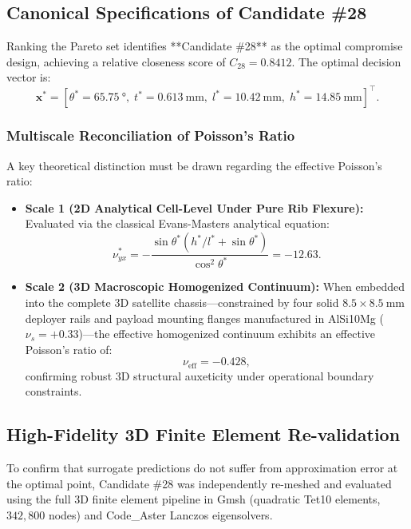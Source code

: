 \subsection{Canonical Specifications of Candidate \#28}

Ranking the Pareto set identifies **Candidate \#28** as the optimal compromise design, achieving a relative closeness score of $C_{28} = 0.8412$. The optimal decision vector is:
\begin{equation}
\mathbf{x}^* = \left[ \theta^* = \SI{65.75}{\degree}, \; t^* = \SI{0.613}{\milli\meter}, \; l^* = \SI{10.42}{\milli\meter}, \; h^* = \SI{14.85}{\milli\meter} \right]^\top.
\label{eq:candidate28_vars}
\end{equation}

\subsubsection{Multiscale Reconciliation of Poisson's Ratio}
A key theoretical distinction must be drawn regarding the effective Poisson's ratio:
\begin{itemize}
\item \textbf{Scale 1 (2D Analytical Cell-Level Under Pure Rib Flexure):} Evaluated via the classical Evans-Masters analytical equation:
\begin{equation}
\nu_{yx}^* = -\frac{\sin\theta^* (h^*/l^* + \sin\theta^*)}{\cos^2\theta^*} = -12.63.
\label{eq:poisson_2d}
\end{equation}
\item \textbf{Scale 2 (3D Macroscopic Homogenized Continuum):} When embedded into the complete 3D satellite chassis—constrained by four solid $8.5 \times \SI{8.5}{\milli\meter}$ deployer rails and payload mounting flanges manufactured in AlSi10Mg ($\nu_s = +0.33$)—the effective homogenized continuum exhibits an effective Poisson's ratio of:
\begin{equation}
\nu_{\text{eff}} = -0.428,
\label{eq:poisson_3d}
\end{equation}
confirming robust 3D structural auxeticity under operational boundary constraints.
\end{itemize}

\subsection{High-Fidelity 3D Finite Element Re-validation}

To confirm that surrogate predictions do not suffer from approximation error at the optimal point, Candidate \#28 was independently re-meshed and evaluated using the full 3D finite element pipeline in Gmsh (quadratic Tet10 elements, $342{,}800$ nodes) and Code\_Aster Lanczos eigensolvers.

